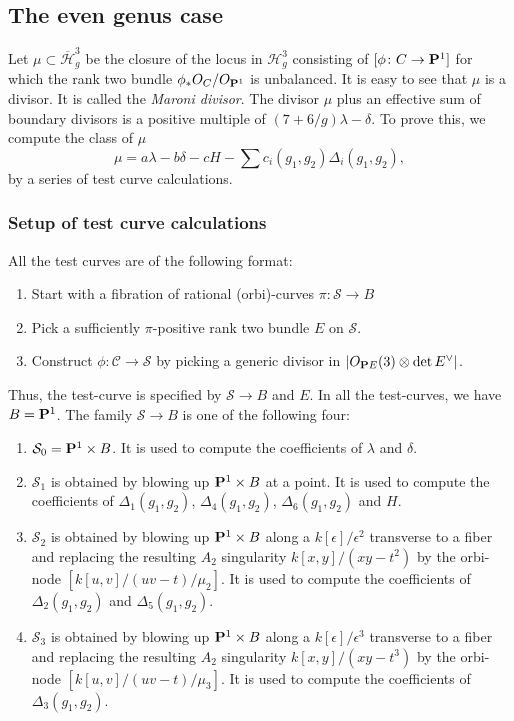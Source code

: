 \documentclass{amsart}
\renewcommand {\P}{{\bf P}}
\newcommand {\from}{{\colon}}
\newcommand{\orb}[1]{{\mathcal #1}}     %
\renewcommand {\o}[1]{\overline{#1}}
\newcommand{\dual}[1]{#1^{\vee}}
\renewcommand{\o}{\overline}
\begin{document}
\subsection{The even genus case}\label{sec:divisor_even}
Let $\mu \subset \o{\orb H}^3_g$ be the closure of the locus in $\orb H^3_g$ consisting of $[\phi \from C \to \P^1]$ for which the rank two bundle $\phi_* O_C/O_{\P^1}$ is unbalanced. It is easy to see that $\mu$ is a divisor. It is called the \emph{Maroni divisor}. The divisor $\mu$ plus an effective sum of boundary divisors is a positive multiple of $(7+6/g) \lambda - \delta$. To prove this, we compute the class of $\mu$
\[ \mu = a \lambda - b \delta - c H - \sum c_i(g_1,g_2) \Delta_i(g_1,g_2),\]
by a series of test curve calculations.

\subsubsection*{Setup of test curve calculations} All the test curves are of the following format:
\begin{enumerate}
\item Start with a fibration of rational (orbi)-curves $\pi \from \orb S \to B$ 
\item Pick a sufficiently $\pi$-positive rank two bundle $E$ on $\orb S$. 
\item Construct $\phi \from \orb C \to \orb S$ by picking a generic
  divisor in $|O_{\P E}(3)\otimes \dual{\det E}|$.
\end{enumerate}
Thus, the test-curve is specified by $\orb S \to B$ and $E$. In all the test-curves, we have $B = \P^1$. The family $\orb S \to B$ is one of the following four:
\begin{enumerate}
\item $\orb S_0 = \P^1 \times B$. It is used to compute the
  coefficients of $\lambda$ and $\delta$.
\item $\orb S_1$ is obtained by blowing up $\P^1 \times B$ at a point. It is used to compute the coefficients of $\Delta_1(g_1,g_2)$, $\Delta_4(g_1,g_2)$, $\Delta_6(g_1,g_2)$ and $H$.
\item $\orb S_2$ is obtained by blowing up $\P^1 \times B$ along a $k[\epsilon]/\epsilon^2$ transverse to a fiber and replacing the resulting $A_2$ singularity $k[x,y]/(xy-t^2)$ by the orbi-node $[k[u,v]/(uv-t) /
  \mu_2]$. It is used to compute the coefficients of $\Delta_2(g_1,g_2)$ and $\Delta_5(g_1,g_2)$.
\item $\orb S_3$ is obtained by blowing up $\P^1 \times B$ along a   $k[\epsilon]/\epsilon^3$ transverse to a fiber and replacing the   resulting $A_2$ singularity $k[x,y]/(xy-t^3)$ by the orbi-node   $[k[u,v]/(uv-t) / \mu_3]$. It is used to compute the coefficients of   $\Delta_3(g_1,g_2)$.
\end{enumerate}
\end{document}
